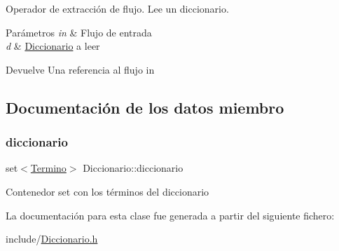 Operador de extracción de flujo. Lee un diccionario. 


\begin{DoxyParams}{Parámetros}
{\em in} & Flujo de entrada \\
\hline
{\em d} & \hyperlink{classDiccionario}{Diccionario} a leer \\
\hline
\end{DoxyParams}
\begin{DoxyReturn}{Devuelve}
Una referencia al flujo in 
\end{DoxyReturn}


\subsection{Documentación de los datos miembro}
\mbox{\label{classDiccionario_a2715031923b30792221622bfa773189c}} 
\subsubsection{\texorpdfstring{diccionario}{diccionario}}
{\footnotesize\ttfamily set$<$\hyperlink{classTermino}{Termino}$>$ Diccionario\+::diccionario\hspace{0.3cm}{\ttfamily [private]}}

Contenedor set con los términos del diccionario 

La documentación para esta clase fue generada a partir del siguiente fichero\+:\begin{DoxyCompactItemize}
\item 
include/\hyperlink{Diccionario_8h}{Diccionario.\+h}\end{DoxyCompactItemize}
